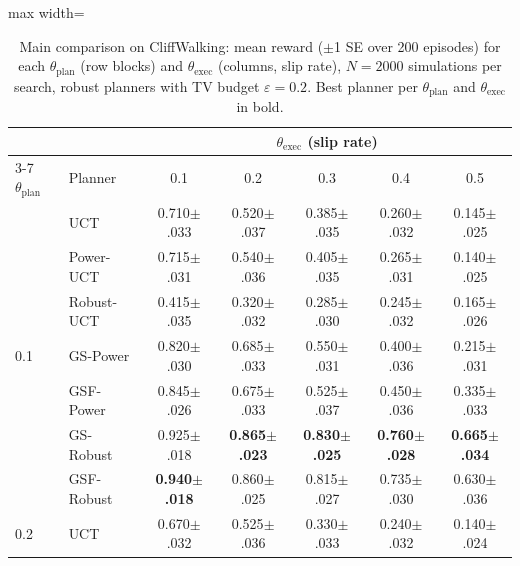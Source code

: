 \begin{table}[t]
\centering
\small
\caption{Main comparison on CliffWalking: mean reward ($\pm$1 SE over 200 episodes) for each $\theta_{\text{plan}}$ (row blocks) and $\theta_{\text{exec}}$ (columns, slip rate), $N = 2000$ simulations per search, robust planners with TV budget $\varepsilon = 0.2$. Best planner per $\theta_{\text{plan}}$ and $\theta_{\text{exec}}$ in bold.}
\label{tab:main-cliffwalking}
\begin{adjustbox}{max width=\linewidth}
\begin{tabular}{llccccc}
\toprule
 & & \multicolumn{5}{c}{$\theta_{\text{exec}}$ (slip rate)} \\
\cmidrule(l){3-7}
$\theta_{\text{plan}}$ & Planner & 0.1 & 0.2 & 0.3 & 0.4 & 0.5 \\
\midrule
\multirow{7}{*}{0.1} & UCT & 0.710{\scriptsize$\pm$.033} & 0.520{\scriptsize$\pm$.037} & 0.385{\scriptsize$\pm$.035} & 0.260{\scriptsize$\pm$.032} & 0.145{\scriptsize$\pm$.025} \\
 & Power-UCT & 0.715{\scriptsize$\pm$.031} & 0.540{\scriptsize$\pm$.036} & 0.405{\scriptsize$\pm$.035} & 0.265{\scriptsize$\pm$.031} & 0.140{\scriptsize$\pm$.025} \\
 & Robust-UCT & 0.415{\scriptsize$\pm$.035} & 0.320{\scriptsize$\pm$.032} & 0.285{\scriptsize$\pm$.030} & 0.245{\scriptsize$\pm$.032} & 0.165{\scriptsize$\pm$.026} \\
 & GS-Power & 0.820{\scriptsize$\pm$.030} & 0.685{\scriptsize$\pm$.033} & 0.550{\scriptsize$\pm$.031} & 0.400{\scriptsize$\pm$.036} & 0.215{\scriptsize$\pm$.031} \\
 & GSF-Power & 0.845{\scriptsize$\pm$.026} & 0.675{\scriptsize$\pm$.033} & 0.525{\scriptsize$\pm$.037} & 0.450{\scriptsize$\pm$.036} & 0.335{\scriptsize$\pm$.033} \\
 & GS-Robust & 0.925{\scriptsize$\pm$.018} & \textbf{0.865{\scriptsize$\pm$.023}} & \textbf{0.830{\scriptsize$\pm$.025}} & \textbf{0.760{\scriptsize$\pm$.028}} & \textbf{0.665{\scriptsize$\pm$.034}} \\
 & GSF-Robust & \textbf{0.940{\scriptsize$\pm$.018}} & 0.860{\scriptsize$\pm$.025} & 0.815{\scriptsize$\pm$.027} & 0.735{\scriptsize$\pm$.030} & 0.630{\scriptsize$\pm$.036} \\
\midrule
\multirow{7}{*}{0.2} & UCT & 0.670{\scriptsize$\pm$.032} & 0.525{\scriptsize$\pm$.036} & 0.330{\scriptsize$\pm$.033} & 0.240{\scriptsize$\pm$.032} & 0.140{\scriptsize$\pm$.024} \\

\end{tabular}
\end{adjustbox}
\end{table}
